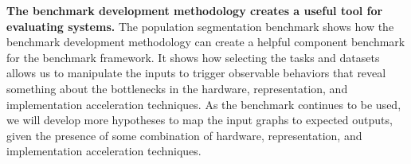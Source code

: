 \textbf{The benchmark development methodology creates a useful tool for evaluating \gai systems.}
The population segmentation benchmark shows how the \gai benchmark development methodology can create a helpful component benchmark for the \gai benchmark framework. 
It shows how selecting the tasks and datasets allows us to manipulate the inputs to trigger observable behaviors that reveal something about the bottlenecks in the hardware, representation, and implementation acceleration techniques.
As the benchmark continues to be used, we will develop more hypotheses to map the input graphs to expected outputs, given the presence of some combination of hardware, representation, and implementation acceleration techniques.




